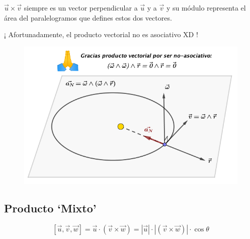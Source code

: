 \vspace{2mm}$\vec u \times \vec v$ siempre es un vector perpendicular a $\vec u$ y a $\vec v$ y su módulo representa el área del paralelogramos que defines estos dos vectores.

\vspace{5mm} ¡ Afortunadamente, el producto vectorial no es asociativo XD !

\begin{figure}[H]
	\centering
	\includegraphics[width=1\textwidth]{imagenes/imagenes10/T10IM11.png}
\end{figure}

\subsection{Producto `Mixto'}
\begin{equation}
\boxed{ \ [\vec u, \vec v, \vec w]=\vec u \cdot (\vec v \times \vec w)=|\vec u|\cdot|(\vec v \times \vec w)|\cdot \cos \theta \ }
\end{equation}

